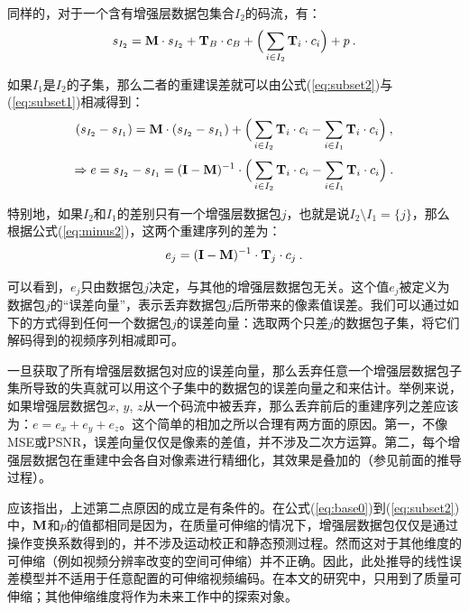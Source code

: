 同样的，对于一个含有增强层数据包集合$I_2$的码流，有：
\begin{equation}
\label{eq:subset2}
s_{I_2} = {\rm\bf M} \cdot s_{I_2} + {\rm\bf T}_{B} \cdot c_{B} + \Big( \sum_{i \in I_2}{\rm\bf T}_i \cdot c_i \Big) + p \: .
\end{equation}

如果$I_1$是$I_2$的子集，那么二者的重建误差就可以由公式(\ref{eq:subset2})与(\ref{eq:subset1})相减得到：
\begin{equation}
\label{eq:minus1}
(s_{I_2} - s_{I_1}) = {\rm\bf M} \cdot (s_{I_2} - s_{I_1}) + \Big( \sum_{i \in I_2}{\rm\bf T}_i \cdot c_i - \sum_{i \in I_1}{\rm\bf T}_i \cdot c_i \Big) \: ,
\end{equation}
\begin{equation}
\label{eq:minus2}
\Rightarrow e = s_{I_2} - s_{I_1} = ({\rm\bf I - M})^{-1} \cdot \Big( \sum_{i \in I_2}{\rm\bf T}_i \cdot c_i - \sum_{i \in I_1}{\rm\bf T}_i \cdot c_i \Big) \: .
\end{equation}

特别地，如果$I_2$和$I_1$的差别只有一个增强层数据包$j$，也就是说$I_2 \setminus I_1 = \{j\}$，那么根据公式(\ref{eq:minus2})，这两个重建序列的差为：
\begin{equation}
\label{eq:error_j}
e_j = ({\rm\bf I - M})^{-1} \cdot {\rm\bf T}_j \cdot c_j \: .
\end{equation}

可以看到，$e_j$只由数据包$j$决定，与其他的增强层数据包无关。这个值$e_j$被定义为数据包$j$的“误差向量”，表示丢弃数据包$j$后所带来的像素值误差。我们可以通过如下的方式得到任何一个数据包$j$的误差向量：选取两个只差$j$的数据包子集，将它们解码得到的视频序列相减即可。

一旦获取了所有增强层数据包对应的误差向量，那么丢弃任意一个增强层数据包子集所导致的失真就可以用这个子集中的数据包的误差向量之和来估计。举例来说，如果增强层数据包$x$, $y$, $z$从一个码流中被丢弃，那么丢弃前后的重建序列之差应该为：$e = e_x + e_y + e_z$。这个简单的相加之所以合理有两方面的原因。第一，不像MSE或PSNR，误差向量仅仅是像素的差值，并不涉及二次方运算。第二，每个增强层数据包在重建中会各自对像素进行精细化，其效果是叠加的（参见前面的推导过程）。

应该指出，上述第二点原因的成立是有条件的。在公式(\ref{eq:base0})到(\ref{eq:subset2})中，${\rm\bf M}$和$p$的值都相同是因为，在质量可伸缩的情况下，增强层数据包仅仅是通过操作变换系数得到的，并不涉及运动校正和静态预测过程。然而这对于其他维度的可伸缩（例如视频分辨率改变的空间可伸缩）并不正确。因此，此处推导的线性误差模型并不适用于任意配置的可伸缩视频编码。在本文的研究中，只用到了质量可伸缩；其他伸缩维度将作为未来工作中的探索对象。

